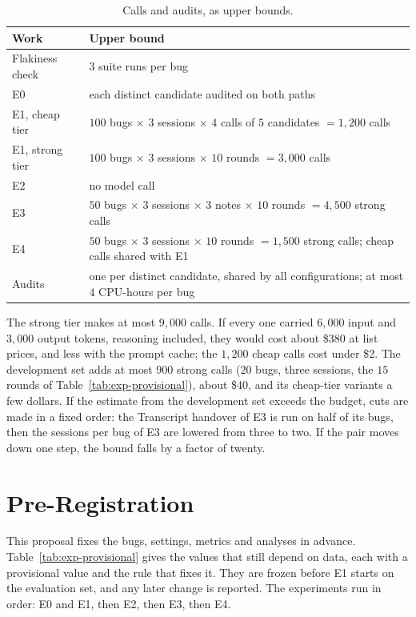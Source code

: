\begin{table}[htbp]
\centering
\caption{Calls and audits, as upper bounds.}
\label{tab:exp-compute}
\footnotesize
\begin{tabularx}{\textwidth}{@{}>{\raggedright\arraybackslash}p{} >{\raggedright\arraybackslash}X@{}}
\toprule
Work & Upper bound\\
\midrule
Flakiness check & $3$ suite runs per bug\\
E0 & each distinct candidate audited on both paths\\
E1, cheap tier & $100$ bugs $\times$ $3$ sessions $\times$ $4$ calls of $5$ candidates $= 1{,}200$ calls\\
E1, strong tier & $100$ bugs $\times$ $3$ sessions $\times$ $10$ rounds $= 3{,}000$ calls\\
E2 & no model call\\
E3 & $50$ bugs $\times$ $3$ sessions $\times$ $3$ notes $\times$ $10$ rounds $= 4{,}500$ strong calls\\
E4 & $50$ bugs $\times$ $3$ sessions $\times$ $10$ rounds $= 1{,}500$ strong calls; cheap calls shared with E1\\
Audits & one per distinct candidate, shared by all configurations; at most $4$ CPU-hours per bug\\
\bottomrule
\end{tabularx}
\end{table}

The strong tier makes at most $9{,}000$ calls. If every one carried $6{,}000$
input and $3{,}000$ output tokens, reasoning included, they would cost about
\$380 at list prices, and less with the prompt cache;
the $1{,}200$ cheap calls cost under \$2. The development set adds at most
$900$ strong calls ($20$ bugs, three sessions, the $15$ rounds of
Table~\ref{tab:exp-provisional}), about \$40, and its cheap-tier variants a
few dollars. If the estimate from the development set exceeds the budget, cuts
are made in a fixed order: the Transcript handover of
E3 is run on half of its bugs, then the sessions per bug of E3 are lowered
from three to two. If the pair moves down one step, the bound falls by a
factor of twenty.

\section{Pre-Registration}
\label{sec:exp-prereg}

This proposal fixes the bugs, settings, metrics and analyses in advance.
Table~\ref{tab:exp-provisional} gives the values that still depend on data,
each with a provisional value and the rule that fixes it. They are frozen
before E1 starts on the evaluation set, and any later change is reported. The
experiments run in order: E0 and E1, then E2, then E3, then E4.

